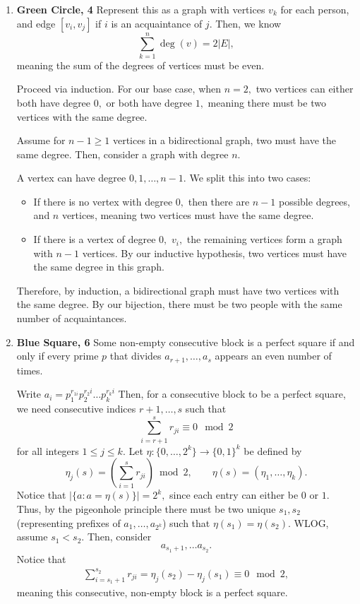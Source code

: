 \documentclass[12pt]{article}
\begin{document}
\begin{enumerate}
  \item \textbf{Green Circle, 4} Represent this as a graph with
    vertices $v_k$ for each person, and edge $[v_i, v_j]$ if $i$ is
    an acquaintance of $j.$ Then, we know
    $$
    \sum_{k = 1}^{n} \deg(v) = 2|E|,
    $$
    meaning the sum of the degrees of vertices must be even.

    Proceed via induction. For our base case, when $n = 2,$ two
    vertices can either both have degree $0,$ or both have degree
    $1,$ meaning there must be two vertices with the same degree.

    Assume for $n - 1 \geq 1$ vertices in a bidirectional graph, two
    must have the same degree. Then, consider a graph with degree $n.$

    A vertex can have degree $0, 1, \ldots, n- 1.$ We split this into two cases:
    \begin{itemize}
      \item If there is no vertex with degree $0,$ then there are $n
        - 1$ possible degrees, and $n$ vertices, meaning two vertices
        must have the same degree.
      \item If there is a vertex of degree $0,$ $v_i,$ the remaining
        vertices form a graph with $n - 1$ vertices. By our inductive
        hypothesis, two vertices must have the same degree in this graph.
    \end{itemize}

    Therefore, by induction, a bidirectional graph must have two
    vertices with the same degree. By our bijection, there must be
    two people with the same number of acquaintances.

  \item \textbf{Blue Square, 6} Some non-empty consecutive block is a
    perfect square if and only if every prime $p$ that divides $a_{r
    + 1}, \ldots, a_{s}$ appears an even number of times.

    Write $a_i = p_1^{r_{1i}} p_2^{r_2i} \ldots p_k^{r_ki}$ Then, for
    a consecutive block to be a perfect square, we need consecutive
    indices $r + 1, \ldots, s$ such that
    $$
    \sum_{i = r+1}^{s} r_{ji} \equiv 0 \mod 2
    $$
    for all integers $1 \leq j \leq k.$ Let $\eta : \{0, \ldots,
    2^k\} \to \{0, 1\}^k$ be defined by
    $$
    \eta_j(s) = \left(\sum_{i = 1}^{s} r_{ji}\right) \bmod 2, \qquad
    \eta(s) = (\eta_1, \ldots, \eta_k).
    $$
    Notice that $|\{a : a = \eta(s)\}| = 2^k,$ since each entry can
    either be $0$ or $1.$ Thus, by the pigeonhole principle there
    must be two unique $s_1, s_2$ (representing prefixes of $a_1,
    \ldots, a_{2^k}$) such that $\eta(s_1) = \eta(s_2).$ WLOG, assume
    $s_1 < s_2.$ Then, consider
    $$
    a_{s_1 +1}, \ldots a_{s_2}.
    $$
    Notice that
    \begin{align*}
      \sum_{i = s_1 + 1}^{s_2} r_{ji} = \eta_j(s_2) - \eta_j(s_1)
      \equiv 0 \mod 2,
    \end{align*}
    meaning this consecutive, non-empty block is a perfect square.


\end{enumerate}
\end{document}
